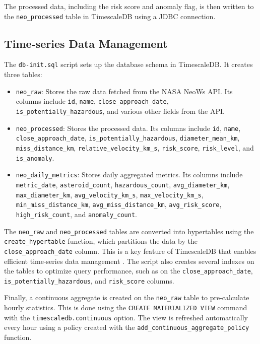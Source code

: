 \documentclass{article}
\begin{document}
The processed data, including the risk score and anomaly flag, is then written to the \texttt{neo\_processed} table in TimescaleDB using a JDBC connection.

\subsection{Time-series Data Management}

The \texttt{db-init.sql} script sets up the database schema in TimescaleDB. It creates three tables:
\begin{itemize}
    \item \texttt{neo\_raw}: Stores the raw data fetched from the NASA NeoWs API. Its columns include \texttt{id}, \texttt{name}, \texttt{close\_approach\_date}, \texttt{is\_potentially\_hazardous}, and various other fields from the API.
    \item \texttt{neo\_processed}: Stores the processed data. Its columns include \texttt{id}, \texttt{name}, \texttt{close\_approach\_date}, \texttt{is\_potentially\_hazardous}, \texttt{diameter\_mean\_km}, \texttt{miss\_distance\_km}, \texttt{relative\_velocity\_km\_s}, \texttt{risk\_score}, \texttt{risk\_level}, and \texttt{is\_anomaly}.
    \item \texttt{neo\_daily\_metrics}: Stores daily aggregated metrics. Its columns include \texttt{metric\_date}, \texttt{asteroid\_count}, \texttt{hazardous\_count}, \texttt{avg\_diameter\_km}, \texttt{max\_diameter\_km}, \texttt{avg\_velocity\_km\_s}, \texttt{max\_velocity\_km\_s}, \texttt{min\_miss\_distance\_km}, \texttt{avg\_miss\_distance\_km}, \texttt{avg\_risk\_score}, \texttt{high\_risk\_count}, and \texttt{anomaly\_count}.
\end{itemize}

The \texttt{neo\_raw} and \texttt{neo\_processed} tables are converted into hypertables using the \texttt{create\_hypertable} function, which partitions the data by the \texttt{close\_approach\_date} column. This is a key feature of TimescaleDB that enables efficient time-series data management \cite{koa2020}. The script also creates several indexes on the tables to optimize query performance, such as on the \texttt{close\_approach\_date}, \texttt{is\_potentially\_hazardous}, and \texttt{risk\_score} columns.

Finally, a continuous aggregate is created on the \texttt{neo\_raw} table to pre-calculate hourly statistics. This is done using the \texttt{CREATE MATERIALIZED VIEW} command with the \texttt{timescaledb.continuous} option. The view is refreshed automatically every hour using a policy created with the \texttt{add\_continuous\_aggregate\_policy} function.
\end{document}

